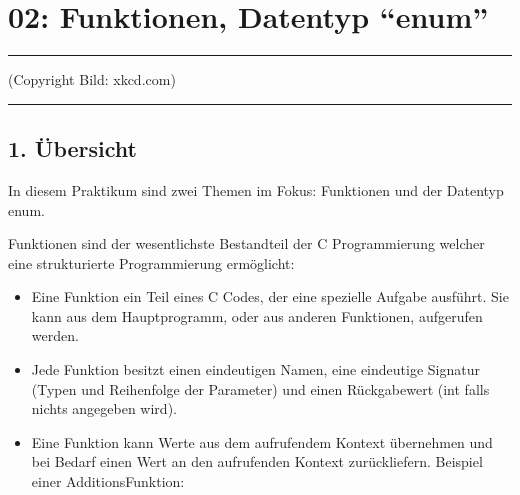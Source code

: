 \documentclass[a4paper,10pt,english]{report}
\begin{document}
\chapter{02:  Funktionen, Datentyp “enum”}
\label{\detokenize{P02_Funktionen_Datentyp_enum/README:funktionen-datentyp-enum}}\label{\detokenize{P02_Funktionen_Datentyp_enum/README::doc}}

\bigskip\hrule\bigskip


\sphinxAtStartPar
{}

\sphinxAtStartPar
(Copyright Bild: xkcd.com)


\bigskip\hrule\bigskip



\section{1. Übersicht}
\label{\detokenize{P02_Funktionen_Datentyp_enum/README:ubersicht}}
\sphinxAtStartPar
In diesem Praktikum sind zwei Themen im Fokus: Funktionen und der Datentyp enum.

\sphinxAtStartPar
Funktionen sind der wesentlichste Bestandteil der C Programmierung welcher eine strukturierte Programmierung ermöglicht:
\begin{itemize}
\item {} 
\sphinxAtStartPar
Eine Funktion ein Teil eines C Codes, der eine spezielle Aufgabe ausführt. Sie kann aus dem Hauptprogramm, oder aus anderen Funktionen, aufgerufen werden.

\item {} 
\sphinxAtStartPar
Jede Funktion besitzt einen eindeutigen Namen, eine eindeutige Signatur (Typen und Reihenfolge der Parameter) und einen Rückgabewert (int falls nichts angegeben wird).

\item {} 
\sphinxAtStartPar
Eine Funktion kann Werte aus dem aufrufendem Kontext übernehmen und bei Bedarf einen Wert an den aufrufenden Kontext zurückliefern.
Beispiel einer Additions\sphinxhyphen{}Funktion:

\end{itemize}
\end{document}
